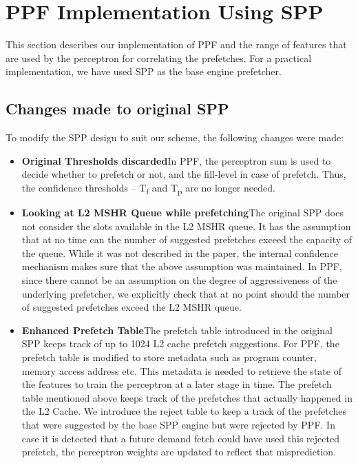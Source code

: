 \section{PPF Implementation Using SPP}
\label{Impl}

This section describes our implementation of PPF and the range of
features that are used by the perceptron for correlating the
prefetches.  For a practical implementation, we have used SPP as the
base engine prefetcher.

\subsection{Changes made to original SPP}
\label{Impl-Changes}
To modify the SPP design to suit our scheme, the following changes
were made:

\begin{itemize}
\item \textbf{Original Thresholds discarded}\newline In PPF, the
  perceptron sum is used to decide whether to prefetch or not, and the
  fill-level in case of prefetch.  Thus, the confidence thresholds --
  T\textsubscript{f} and T\textsubscript{p} are no longer needed.


\item \textbf{Looking at L2 MSHR Queue while prefetching}\newline The
  original SPP does not consider the slots available in the L2 MSHR
  queue.  It has the assumption that at no time can the number of
  suggested prefetches exceed the capacity of the queue.  While it was
  not described in the paper, the internal confidence mechanism makes
  sure that the above assumption was maintained.  In PPF, since there
  cannot be an assumption on the degree of aggressiveness of the
  underlying prefetcher, we explicitly check that at no point should
  the number of suggested prefetches exceed the L2 MSHR queue. 

\item \textbf{Enhanced Prefetch Table}\newline The prefetch table
  introduced in the original SPP keeps track of up to 1024 L2 cache
  prefetch suggestions.  For PPF, the prefetch table is modified to
  store metadata such as program counter, memory access address etc.
  This metadata is needed to retrieve the
  state %
  of the features to train the perceptron at a later stage in
  time. The prefetch table mentioned above keeps track of the
  prefetches that actually happened in the L2 Cache.  We introduce the
  reject table to keep a track of the prefetches that were suggested
  by the base SPP engine but were rejected by PPF.  In case it is
  detected that a future demand fetch could have used this rejected
  prefetch, the perceptron weights are updated to reflect that
  misprediction.

\end{itemize}


